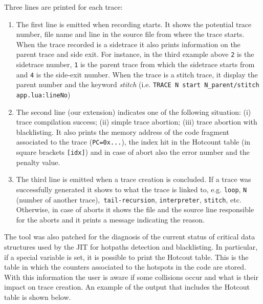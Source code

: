 \noindent
Three lines are printed for each trace:

\begin{enumerate}
    \item The first line is emitted when recording starts. It shows the potential trace number, file name and line in the source file from where the trace starts. When the trace recorded is a sidetrace it also prints information on the parent trace and side exit. For instance, in the third example above \texttt{2} is the sidetrace number, \texttt{1} is the parent trace from which the sidetrace starts from and \texttt{4} is the side-exit number. When the trace is a stitch trace, it display the parent number and the keyword \textit{stitch} (i.e. \texttt{TRACE N start N\_parent/stitch app.lua:lineNo})
    
    \item The second line (our extension) indicates one of the following situation: (i) trace compilation success; (ii) simple trace abortion; (iii) trace abortion with blacklisting. It also prints the memory address of the code fragment associated to the trace (\texttt{PC=0x...}), the index hit in the Hotcount table (in square brackets \texttt{[idx]}) and in case of abort also the error number and the penalty value. 

    \item The third line is emitted when a trace creation is concluded. If a trace was successfully generated it shows to what the trace is linked to, e.g. \texttt{loop}, \texttt{N} (number of another trace),\texttt{ tail-recursion}, \texttt{interpreter}, \texttt{stitch}, etc. Otherwise, in case of aborts it shows the file and the source line responsible for the aborts and it prints a message indicating the reason.
\end{enumerate}

\noindent
The tool was also patched for the diagnosis of the current status of critical data structures used by the JIT for hotpaths detection and blacklisting. In particular, if a special variable is set, it is possible to print the Hotcout table. This is the table in which the counters associated to the hotspots in the code are stored. With this information the user is aware if some collisions occur and what is their impact on trace creation. An example of the output that includes the Hotcout table is shown below.

